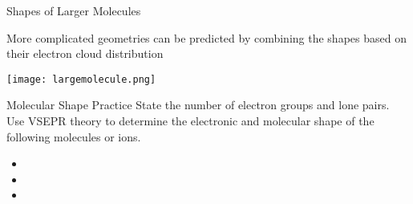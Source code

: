\documentclass[notes=hide]{beamer}
\begin{document}

\begin{frame}{Shapes of Larger Molecules}

	More complicated geometries can be predicted by combining the shapes
	based on their electron cloud distribution

	\bigskip

	\begin{center}
	\texttt{[image: largemolecule.png]}
	\qquad
\end{center}
\end{frame}

\begin{frame}[t]{Molecular Shape Practice}
	State the number of electron groups and lone pairs. Use VSEPR theory to
	determine the electronic and molecular shape of the following molecules
	or ions.

	\begin{itemize}
		\item {} 
		\item {} 
		\item {} 
	\end{itemize}

	\vspace{10em}
\end{frame}

%
%
\end{document}
